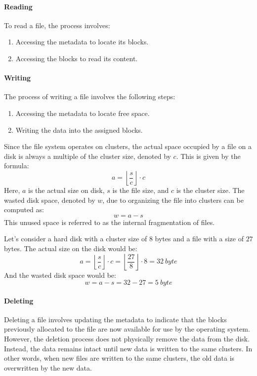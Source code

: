 \paragraph*{Reading}
To read a file, the process involves:
\begin{enumerate}
    \item Accessing the metadata to locate its blocks.
    \item Accessing the blocks to read its content.
\end{enumerate}

\paragraph*{Writing}
The process of writing a file involves the following steps:
\begin{enumerate}
    \item Accessing the metadata to locate free space.
    \item Writing the data into the assigned blocks.
\end{enumerate}
Since the file system operates on clusters, the actual space occupied by a file on a disk is always a multiple of the cluster size, denoted by $c$. 
This is given by the formula:
\[a=\left\lfloor \dfrac{s}{c} \right\rfloor\cdot c\]
Here, $a$ is the actual size on disk, $s$ is the file size, and $c$ is the cluster size.
The wasted disk space, denoted by $w$, due to organizing the file into clusters can be computed as:
\[w=a-s\]
This unused space is referred to as the internal fragmentation of files.
\begin{example}
    Let's consider a hard disk with a cluster size of $8$ bytes and a file with a size of $27$ bytes. 
    The actual size on the disk would be:
    \[a=\left\lfloor \dfrac{s}{c} \right\rfloor\cdot c=\left\lfloor \dfrac{27}{8} \right\rfloor\cdot 8=32\:byte\]
    And the wasted disk space would be:
    \[w=a-s=32-27=5\:byte\]
\end{example}

\paragraph*{Deleting}
Deleting a file involves updating the metadata to indicate that the blocks previously allocated to the file are now available for use by the operating system. 
However, the deletion process does not physically remove the data from the disk. 
Instead, the data remains intact until new data is written to the same clusters. 
In other words, when new files are written to the same clusters, the old data is overwritten by the new data.

